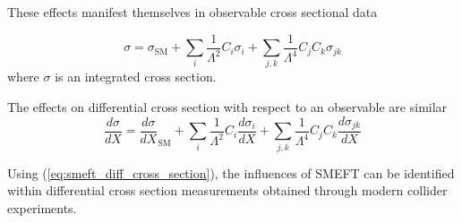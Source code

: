 \documentclass[a4paper]{article}
\begin{document}
These effects manifest themselves in observable cross sectional data \cite{Hartland_2019}

\begin{equation}\label{eq:smeft_cross_section}
    \sigma = \sigma_{\text{SM}} + \sum\limits_{i} \frac{1}{\Lambda^2} C_{i} \sigma_{i} + \sum\limits_{j,k} \frac{1}{\Lambda^4} C_{j} C_{k} \sigma_{j k}
\end{equation}
where $\sigma$ is an integrated cross section.

The effects on differential cross section with respect to an observable are similar
\begin{equation}\label{eq:smeft_diff_cross_section}
    \frac{d\sigma}{dX} = \frac{d\sigma}{dX}_{\text{SM}} + \sum\limits_{i} \frac{1}{\Lambda^2} C_{i} \frac{d\sigma_{i}}{dX} + \sum\limits_{j,k} \frac{1}{\Lambda^4} C_{j} C_{k} \frac{d\sigma_{j k}}{dX}
\end{equation}

Using (\ref{eq:smeft_diff_cross_section}), the influences of SMEFT can be identified within differential cross section measurements obtained through modern collider experiments.

\end{document}
